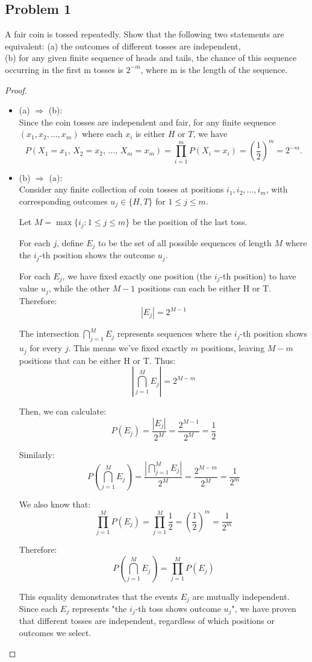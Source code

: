 \documentclass[letterpaper, 11pt]{article}
\newcommand{\1}{\mathds{1}}	%
\theoremstyle{definition}
\begin{document}
\subsection*{Problem 1}
A fair coin is tossed repeatedly. Show that the following two statements are equivalent:
(a) the outcomes of different tosses are independent,\\
(b) for any given finite sequence of heads and tails, the chance of this sequence occurring in the first m tosses is $2^{-m}$, where m is the length of the sequence.
\begin{proof}

\begin{itemize}
  \item (a) $\Rightarrow$ (b):\\
  Since the coin tosses are independent and fair, for any finite sequence \((x_1, x_2, \dots, x_m)\) where each \(x_i\) is either \(H\) or \(T\), we have
  \[
  P(X_1 = x_1,\, X_2 = x_2,\, \dots,\, X_m = x_m)
  = \prod_{i=1}^m P(X_i = x_i)
  = \left(\frac{1}{2}\right)^m = 2^{-m}.
  \]

  \item (b) $\Rightarrow$ (a):\\
  Consider any finite collection of coin tosses at positions \(i_1, i_2, \ldots, i_m\), with corresponding outcomes \(u_j \in \{H, T\}\) for \(1 \leq j \leq m\).
  
  Let \(M = \max\{i_j : 1 \leq j \leq m\}\) be the position of the last toss.
  
  For each \(j\), define \(E_j\) to be the set of all possible sequences of length \(M\) where the \(i_j\)-th position shows the outcome \(u_j\).
  
  For each \(E_j\), we have fixed exactly one position (the \(i_j\)-th position) to have value \(u_j\), while the other \(M-1\) positions can each be either H or T. Therefore:
    \[|E_j| = 2^{M-1}\]
    
    The intersection \(\bigcap_{j=1}^M E_j\) represents sequences where the \(i_j\)-th position shows \(u_j\) for every \(j\). This means we've fixed exactly \(m\) positions, leaving \(M-m\) positions that can be either H or T. Thus:
    \[|\bigcap_{j=1}^M E_j| = 2^{M-m}\]
    
  Then, we can calculate:
    \[P(E_j) = \frac{|E_j|}{2^M} = \frac{2^{M-1}}{2^M} = \frac{1}{2}\]
    
  Similarly:
    \[P\left(\bigcap_{j=1}^M E_j\right) = \frac{|\bigcap_{j=1}^M E_j|}{2^M} = \frac{2^{M-m}}{2^M} = \frac{1}{2^m}\]
    
  We also know that:
    \[\prod_{j=1}^M P(E_j) = \prod_{j=1}^M \frac{1}{2} = \left(\frac{1}{2}\right)^m = \frac{1}{2^m}\]
  
  Therefore:
  \[P\left(\bigcap_{j=1}^M E_j\right) = \prod_{j=1}^MP(E_j)\]
  
  This equality demonstrates that the events \(E_j\) are mutually independent. Since each \(E_j\) represents "the \(i_j\)-th toss shows outcome \(u_j\)", we have proven that different tosses are independent, regardless of which positions or outcomes we select.

\end{itemize}
\end{proof}
\end{document}
